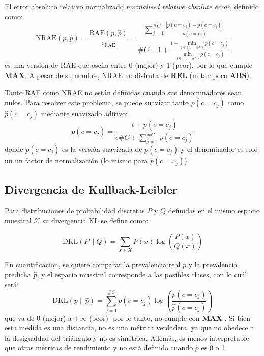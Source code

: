 El error absoluto relativo normalizado {\it normalised relative absolute error},
definido como:
\begin{equation}
    {\text{NRAE}(p, \hat p)} = \frac{\text{RAE}(p, \hat p)}{z_{\text{RAE}}} = \frac{\sum \limits_{j=1}^{\#C}{\frac{|\hat p(c=c_j) - p(c=c_j)|}{p(c=c_j)}}}{\#C - 1 + \frac {1 - \displaystyle \min_{j\in\{1,\dots,\#C\}}p(c=c_j)}{\displaystyle \min_{j\in\{1,\dots,\#C\}}p(c=c_j)}}
\end{equation}
es una versión de RAE que oscila entre 0 (mejor) y 1 (peor), por lo que cumple
{\bf MAX}. A pesar de su nombre, NRAE no disfruta de {\bf REL} (ni tampoco {\bf
ABS}).

Tanto RAE como NRAE no están definidas cuando sus denominadores sean nulos. Para
resolver este problema, se puede suavizar tanto $p(c=c_j)$ como $\hat p(c=c_j)$
mediante suavizado aditivo:
\begin{equation}
    \underline p(c=c_j) = \frac{\epsilon + p(c=c_j)}{\epsilon  \#C + \sum \limits_{j=1}^{\#C}{p(c=c_j)}}
\end{equation}
donde $\underline p(c=c_j)$ es la versión suavizada de $p(c=c_j)$ y el
denominador es solo un un factor de normalización (lo mismo para $\underline
{\hat p}(c=c_j)$).

\subsection{Divergencia de Kullback-Leibler}

Para distribuciones de probabilidad discretas $P$ y $Q$ definidas en el mismo
espacio muestral ${\mathcal {X}}$ su divergencia KL se define como:

\begin{equation}
    {\text{DKL}}(P\parallel Q)=\sum \limits_{x\in {X}}P(x)\log \left({\frac {P(x)}{Q(x)}}\right)
\end{equation}

En cuantificación, se quiere comparar la prevalencia real $p$ y la prevalencia
predicha $\hat{p}$, y el espacio muestral corresponde a las posibles clases, con
lo cuál será:
\begin{equation}
    {\text{DKL}}(p\parallel \hat{p}) = \sum \limits_{j=1}^{\#C}p(c=c_j)\log \left({\frac {p(c=c_j)}{\hat p(c=c_j)}}\right)
\end{equation}
que va de {0} (mejor) a {+$\infty$} (peor) -por lo tanto, no cumple con {\bf
MAX}-. Si bien esta medida es una distancia, no es una métrica verdadera, ya que
no obedece a la desigualdad del triángulo y no es simétrica. Además, es menos
interpretable que otras métricas de rendimiento y no está definido cuando
$\hat{p}$ es 0 o 1.

